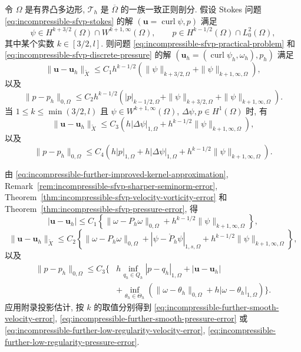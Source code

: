 \begin{Theorem}\label{thm:incompressible-further-smooth-error}
令 $\Omega$ 是有界凸多边形,
$\mathcal T_h$ 是 $\overline\Omega$ 的一族一致正则剖分.
假设 Stokes 问题 \eqref{eq:incompressible-sfvp-stokes}
的解 $(\mathbf u=\operatorname{curl}\psi,p)$ 满足
\[
\psi\in H^{k+3/2}(\Omega)\cap W^{k+1,\infty}(\Omega),
\qquad
p\in H^{k-1/2}(\Omega)\cap L_0^2(\Omega),
\]
其中某个实数 $k\in[3/2,l]$.
则问题 \eqref{eq:incompressible-sfvp-practical-problem}
和 \eqref{eq:incompressible-sfvp-discrete-pressure}
的解
$(\mathbf u_h=(\operatorname{curl}\psi_h,\omega_h),p_h)$ 满足
\begin{equation}\label{eq:incompressible-further-smooth-velocity-error}
\|\mathbf u-\mathbf u_h\|_{\widetilde X}
\leq C_1h^{k-1/2}
\left(\|\psi\|_{k+3/2,\Omega}
+\|\psi\|_{k+1,\infty,\Omega}\right),
\end{equation}
以及
\begin{equation}\label{eq:incompressible-further-smooth-pressure-error}
\|p-p_h\|_{0,\Omega}
\leq C_2h^{k-1/2}
\left(|p|_{k-1/2,\Omega}
+\|\psi\|_{k+3/2,\Omega}
+\|\psi\|_{k+1,\infty,\Omega}\right).
\end{equation}
当 $1\leq k\leq\min(3/2,l)$ 且
$\psi\in W^{k+1,\infty}(\Omega)$,
$\Delta\psi,p\in H^1(\Omega)$ 时, 有
\begin{equation}\label{eq:incompressible-further-low-regularity-velocity-error}
\|\mathbf u-\mathbf u_h\|_{\widetilde X}
\leq C_3\left(
h|\Delta\psi|_{1,\Omega}
+h^{k-1/2}\|\psi\|_{k+1,\infty,\Omega}\right),
\end{equation}
以及
\begin{equation}\label{eq:incompressible-further-low-regularity-pressure-error}
\|p-p_h\|_{0,\Omega}
\leq C_4\left(
h|p|_{1,\Omega}+h|\Delta\psi|_{1,\Omega}
+h^{k-1/2}\|\psi\|_{k+1,\infty,\Omega}\right).
\end{equation}
\end{Theorem}

\begin{Proof}
由 \eqref{eq:incompressible-further-improved-kernel-approximation},
Remark~\ref{rem:incompressible-sfvp-sharper-seminorm-error},
Theorem~\ref{thm:incompressible-sfvp-velocity-vorticity-error}
和 Theorem~\ref{thm:incompressible-sfvp-pressure-error}, 得
\[
|\mathbf u-\mathbf u_h|
\leq C_1\left\{
\|\omega-P_h\omega\|_{0,\Omega}
+h^{k-1/2}\|\psi\|_{k+1,\infty,\Omega}\right\},
\]
\[
\|\mathbf u-\mathbf u_h\|_{\widetilde X}
\leq C_2\left\{
\|\omega-P_h\omega\|_{0,\Omega}
+|\psi-\mathring P_h\psi|_{1,s,\Omega}
+h^{k-1/2}\|\psi\|_{k+1,\infty,\Omega}\right\},
\]
以及
\[
\begin{split}
\|p-p_h\|_{0,\Omega}
\leq C_3\biggl\{&h\inf_{q_h\in Q_h}|p-q_h|_{1,\Omega}
+|\mathbf u-\mathbf u_h|\\
&+\inf_{\theta_h\in\Theta_h}
\left(\|\omega-\theta_h\|_{0,\Omega}
+h|\omega-\theta_h|_{1,\Omega}\right)\biggr\}.
\end{split}
\]
应用附录投影估计, 按 $k$ 的取值分别得到
\eqref{eq:incompressible-further-smooth-velocity-error},
\eqref{eq:incompressible-further-smooth-pressure-error}
或 \eqref{eq:incompressible-further-low-regularity-velocity-error},
\eqref{eq:incompressible-further-low-regularity-pressure-error}.
\end{Proof}

